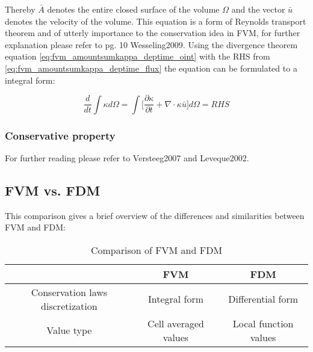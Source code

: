 Thereby $\bar{A}$ denotes the entire closed surface of the volume $\Omega$ and the vector
$\bar{u}$ denotes the velocity of the volume. This equation is a form of Reynolds 
transport theorem and of utterly importance to the conservation idea in FVM, for further explanation please refer to pg. 10 Wesseling2009.
Using the divergence theorem equation \ref{eq:fvm_amountsumkappa_deptime_oint} with the RHS from \ref{eq:fvm_amountsumkappa_deptime_flux} 
the equation can be formulated to a integral form:

\begin{equation}\label{eq:fvm_cons_form_conservat}
\frac {d}{dt} \int \kappa d \Omega = 
\int \biggl [\frac{\partial \kappa}{\partial t} + \nabla \cdot \kappa \bar{u} \biggr] d \Omega = RHS
\end{equation}


\subsubsection{Conservative property}



For further reading please refer to Versteeg2007 and Leveque2002.

\subsection{FVM vs. FDM}

This comparison gives a brief overview of the differences and similarities between
FVM and FDM:
\begin{table}[htp]
\centering
\begin{tabular}{c|c|c}\label{fig:FVM_vs_FDM_simi}
 & FVM & FDM \\
\hline
Conservation laws discretization & Integral form & Differential form \\
\hline
Value type & Cell averaged values & Local function values \\
\end{tabular}
\caption{Comparison of FVM and FDM}
\end{table}





